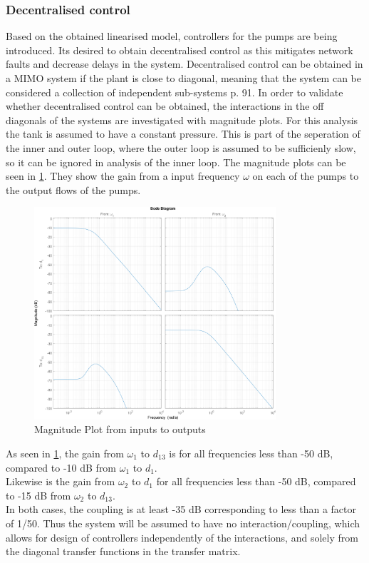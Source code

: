 \subsubsection{Decentralised control}
Based on the obtained linearised model, controllers for the pumps are being introduced. Its desired to obtain decentralised control as this mitigates network faults and decrease delays in the system. Decentralised control can be obtained in a MIMO system if the plant is close to diagonal, meaning that the system can be considered a collection of independent sub-systems \cite{Skogestad2005} p. 91. 
In order to validate whether decentralised control can be obtained, the interactions in the off diagonals of the systems are investigated with magnitude plots. For this analysis the tank is assumed to have a constant pressure. This is part of the seperation of the inner and outer loop, where the outer loop is assumed to be sufficienly slow, so it can be ignored in analysis of the inner loop. The magnitude plots can be seen in \cref{fig:PumpMagPlot}. They show the gain from a input frequency $\omega$ on each of the pumps to the output flows of the pumps.

\begin{figure}[h!]
	\centering
		\includegraphics[width=0.8\textwidth]{Pictures/PumpMagPlot.png}
		
		\caption{Magnitude Plot from inputs to outputs}
	\label{fig:PumpMagPlot}
\end{figure}

As seen in \cref{fig:PumpMagPlot}, the gain from $\omega_1$ to $d_{13}$ is for all frequencies less than -50 dB, compared to -10 dB from $\omega_1$ to $d_1$. \\
Likewise is the gain from $\omega_2$ to $d_1$ for all frequencies less than -50 dB, compared to -15 dB from $\omega_2$ to $d_{13}$.\\
In both cases, the coupling is at least -35 dB corresponding to less than a factor of 1/50. Thus the system will be assumed to have no interaction/coupling, which allows for design of controllers independently of the interactions, and solely from the diagonal transfer functions in the transfer matrix.

